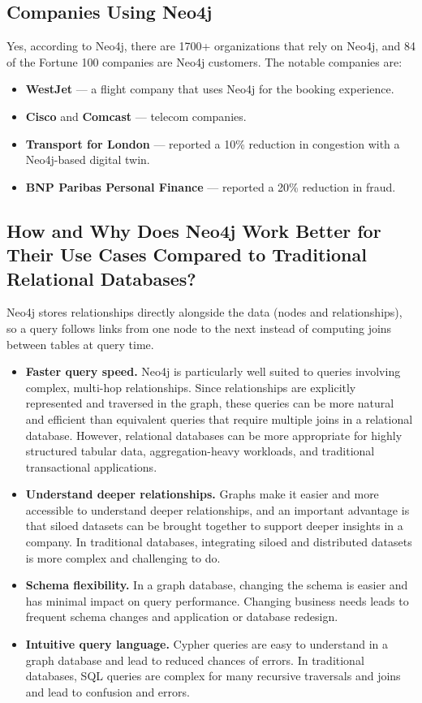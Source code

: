 \documentclass[10pt,a4paper,twocolumn]{article}
\begin{document}
\subsection{Companies Using Neo4j}

Yes, according to Neo4j, there are 1700+ organizations that rely on Neo4j, and 84 of the Fortune 100 companies are Neo4j customers. The notable companies are:

\begin{itemize}
  \item \textbf{WestJet} --- a flight company that uses Neo4j for the booking experience.
  \item \textbf{Cisco} and \textbf{Comcast} --- telecom companies.
  \item \textbf{Transport for London} --- reported a 10\% reduction in congestion with a Neo4j-based digital twin.
  \item \textbf{BNP Paribas Personal Finance} --- reported a 20\% reduction in fraud.
\end{itemize}

\subsection{How and Why Does Neo4j Work Better for Their Use Cases Compared to Traditional Relational Databases?}

Neo4j stores relationships directly alongside the data (nodes and relationships), so a query follows links from one node to the next instead of computing joins between tables at query time.

\begin{itemize}
  \item \textbf{Faster query speed.} Neo4j is particularly well suited to queries involving complex, multi-hop relationships. Since relationships are explicitly represented and traversed in the graph, these queries can be more natural and efficient than equivalent queries that require multiple joins in a relational database. However, relational databases can be more appropriate for highly structured tabular data, aggregation-heavy workloads, and traditional transactional applications.
  \item \textbf{Understand deeper relationships.} Graphs make it easier and more accessible to understand deeper relationships, and an important advantage is that siloed datasets can be brought together to support deeper insights in a company. In traditional databases, integrating siloed and distributed datasets is more complex and challenging to do.
  \item \textbf{Schema flexibility.} In a graph database, changing the schema is easier and has minimal impact on query performance. Changing business needs leads to frequent schema changes and application or database redesign.
  \item \textbf{Intuitive query language.} Cypher queries are easy to understand in a graph database and lead to reduced chances of errors. In traditional databases, SQL queries are complex for many recursive traversals and joins and lead to confusion and errors.
\end{itemize}
\end{document}
